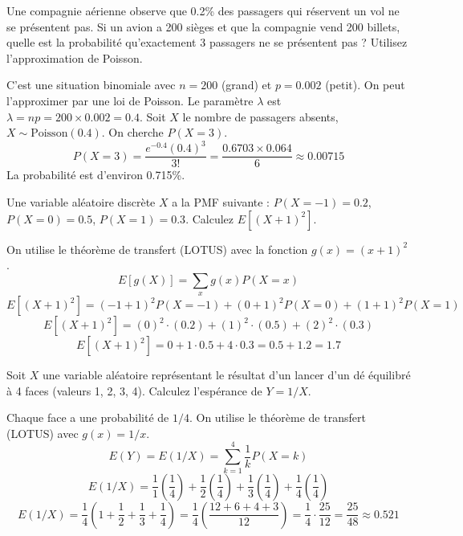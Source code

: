 \begin{exercicebox}
Une compagnie aérienne observe que 0.2\% des passagers qui réservent un vol ne se présentent pas. Si un avion a 200 sièges et que la compagnie vend 200 billets, quelle est la probabilité qu'exactement 3 passagers ne se présentent pas ? Utilisez l'approximation de Poisson.
\end{exercicebox}

\begin{correctionbox}
C'est une situation binomiale avec $n=200$ (grand) et $p=0.002$ (petit). On peut l'approximer par une loi de Poisson.
Le paramètre $\lambda$ est $\lambda = np = 200 \times 0.002 = 0.4$.
Soit $X$ le nombre de passagers absents, $X \sim \text{Poisson}(0.4)$. On cherche $P(X=3)$.
$$ P(X=3) = \frac{e^{-0.4}(0.4)^3}{3!} = \frac{0.6703 \times 0.064}{6} \approx 0.00715 $$
La probabilité est d'environ 0.715\%.
\end{correctionbox}

\begin{exercicebox}[LOTUS]
Une variable aléatoire discrète $X$ a la PMF suivante : $P(X=-1)=0.2$, $P(X=0)=0.5$, $P(X=1)=0.3$. Calculez $E[ (X+1)^2 ]$.
\end{exercicebox}

\begin{correctionbox}
On utilise le théorème de transfert (LOTUS) avec la fonction $g(x) = (x+1)^2$.
$$ E[g(X)] = \sum_x g(x) P(X=x) $$
$$ E[(X+1)^2] = (-1+1)^2 P(X=-1) + (0+1)^2 P(X=0) + (1+1)^2 P(X=1) $$
$$ E[(X+1)^2] = (0)^2 \cdot (0.2) + (1)^2 \cdot (0.5) + (2)^2 \cdot (0.3) $$
$$ E[(X+1)^2] = 0 + 1 \cdot 0.5 + 4 \cdot 0.3 = 0.5 + 1.2 = 1.7 $$
\end{correctionbox}

\begin{exercicebox}
Soit $X$ une variable aléatoire représentant le résultat d'un lancer d'un dé équilibré à 4 faces (valeurs 1, 2, 3, 4). Calculez l'espérance de $Y = 1/X$.
\end{exercicebox}

\begin{correctionbox}
Chaque face a une probabilité de $1/4$. On utilise le théorème de transfert (LOTUS) avec $g(x) = 1/x$.
$$ E(Y) = E(1/X) = \sum_{k=1}^4 \frac{1}{k} P(X=k) $$
$$ E(1/X) = \frac{1}{1}\left(\frac{1}{4}\right) + \frac{1}{2}\left(\frac{1}{4}\right) + \frac{1}{3}\left(\frac{1}{4}\right) + \frac{1}{4}\left(\frac{1}{4}\right) $$
$$ E(1/X) = \frac{1}{4} \left(1 + \frac{1}{2} + \frac{1}{3} + \frac{1}{4}\right) = \frac{1}{4} \left(\frac{12+6+4+3}{12}\right) = \frac{1}{4} \cdot \frac{25}{12} = \frac{25}{48} \approx 0.521 $$
\end{correctionbox}

